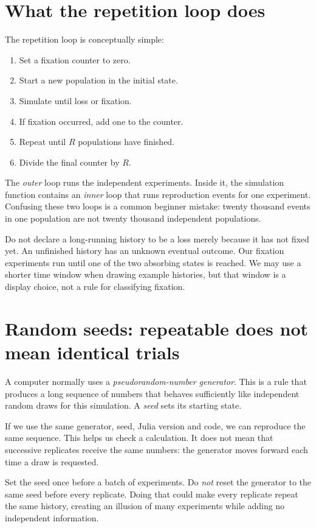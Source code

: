 \section{What the repetition loop does}

The repetition loop is conceptually simple:
\begin{enumerate}
\item Set a fixation counter to zero.
\item Start a new population in the initial state.
\item Simulate until loss or fixation.
\item If fixation occurred, add one to the counter.
\item Repeat until $R$ populations have finished.
\item Divide the final counter by $R$.
\end{enumerate}

The \emph{outer} loop runs the independent experiments. Inside it, the simulation function contains an \emph{inner} loop that runs reproduction events for one experiment. Confusing these two loops is a common beginner mistake: twenty thousand events in one population are not twenty thousand independent populations.

Do not declare a long-running history to be a loss merely because it has not fixed yet. An unfinished history has an unknown eventual outcome. Our fixation experiments run until one of the two absorbing states is reached. We may use a shorter time window when drawing example histories, but that window is a display choice, not a rule for classifying fixation.

\section{Random seeds: repeatable does not mean identical trials}

A computer normally uses a \emph{pseudorandom-number generator}. This is a rule that produces a long sequence of numbers that behaves sufficiently like independent random draws for this simulation. A \emph{seed} sets its starting state.

If we use the same generator, seed, Julia version and code, we can reproduce the same sequence. This helps us check a calculation. It does not mean that successive replicates receive the same numbers: the generator moves forward each time a draw is requested.

Set the seed once before a batch of experiments. Do \emph{not} reset the generator to the same seed before every replicate. Doing that could make every replicate repeat the same history, creating an illusion of many experiments while adding no independent information.

